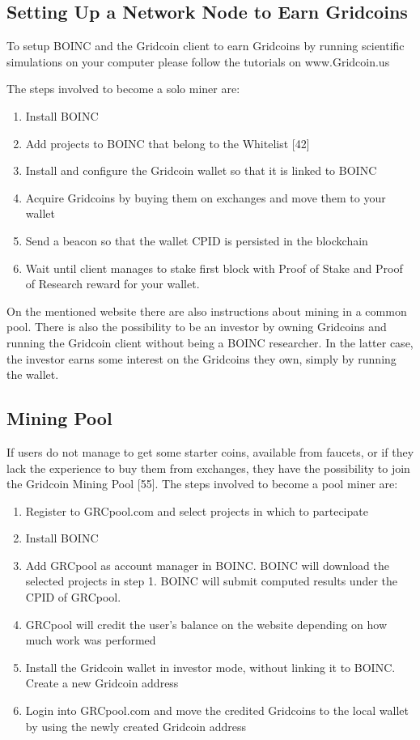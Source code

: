 \subsection{Setting Up a Network Node to Earn Gridcoins}

To setup BOINC and the Gridcoin client to earn Gridcoins by running scientific simulations on your computer please follow the tutorials on www.Gridcoin.us

The steps involved to become a solo miner are:
\begin{enumerate}
  \item Install BOINC
  \item Add projects to BOINC that belong to the Whitelist [42]
  \item Install and configure the Gridcoin wallet so that it is linked to BOINC 
  \item Acquire Gridcoins by buying them on exchanges and move them to your wallet
  \item Send a beacon so that the wallet CPID is persisted in the blockchain
  \item Wait until client manages to stake first block with Proof of Stake and Proof of Research reward for your wallet.
\end{enumerate}

On the mentioned website there are also instructions about mining in a common pool. There is also the possibility to be an investor by owning Gridcoins and running the Gridcoin client without being a BOINC researcher. In the latter case, the investor earns some interest on the Gridcoins they own, simply by running the wallet.\\

\subsection{Mining Pool}

If users do not manage to get some starter coins, available from faucets, or if they lack the experience to buy them from exchanges, they have the possibility to join the Gridcoin Mining Pool [55]. The steps involved to become a pool miner are:

\begin{enumerate}
  \item Register to GRCpool.com and select projects in which to partecipate
  \item Install BOINC
  \item Add GRCpool as account manager in BOINC. BOINC will download the selected projects in step 1. BOINC will submit computed results under the CPID of GRCpool.
  \item GRCpool will credit the user's balance on the website depending on how much work was performed 
  \item Install the Gridcoin wallet in investor mode, without linking it to BOINC. Create a new Gridcoin address 
  \item Login into GRCpool.com and move the credited Gridcoins to the local wallet by using the newly created Gridcoin address
\end{enumerate}

